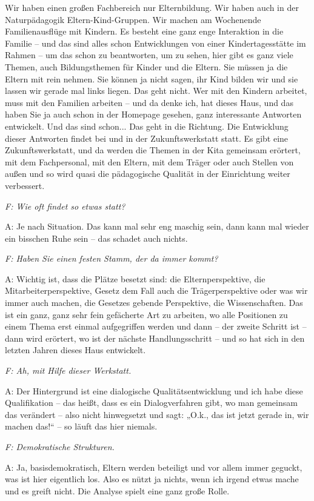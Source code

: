 \begin{linenumbers}
Wir haben einen großen Fachbereich nur Elternbildung. Wir haben auch in der Naturpädagogik Eltern-Kind-Gruppen. Wir machen am Wochenende Familienausflüge mit Kindern. Es besteht eine ganz enge Interaktion in die Familie -- und das sind alles schon Entwicklungen von einer Kindertagesstätte im Rahmen -- um das schon zu beantworten, um zu sehen, hier gibt es ganz viele Themen, auch Bildungsthemen für Kinder und die Eltern. Sie müssen ja die Eltern mit rein nehmen. Sie können ja nicht sagen, ihr Kind bilden wir und sie lassen wir gerade mal links liegen. Das geht nicht. Wer mit den Kindern arbeitet, muss mit den Familien arbeiten -- und da denke ich, hat dieses Haus, und das haben Sie ja auch schon in der Homepage gesehen, ganz interessante Antworten entwickelt. Und das sind schon... Das geht in die Richtung. Die Entwicklung dieser Antworten findet bei und in der Zukunftswerkstatt statt. Es gibt eine Zukunftswerkstatt, und da werden die Themen in der Kita gemeinsam erörtert, mit dem Fachpersonal, mit den Eltern, mit dem Träger oder auch Stellen von außen und so wird quasi die pädagogische Qualität in der Einrichtung weiter verbessert. 

\emph{F: Wie oft findet so etwas statt?}

A: Je nach Situation. Das kann mal sehr eng maschig sein, dann kann mal wieder ein bisschen Ruhe sein -- das schadet auch nichts. 

\emph{F: Haben Sie einen festen Stamm, der da immer kommt?}

A: Wichtig ist, dass die Plätze besetzt sind: die Elternperspektive, die Mitarbeiterperspektive, Gesetz dem Fall auch die Trägerperspektive oder was wir immer auch machen, die Gesetzes gebende Perspektive, die Wissenschaften. Das ist ein ganz, ganz sehr fein gefächerte Art zu arbeiten, wo alle Positionen zu einem Thema erst einmal aufgegriffen werden und dann -- der zweite Schritt ist -- dann wird erörtert, wo ist der nächste Handlungsschritt -- und so hat sich in den letzten Jahren dieses Haus entwickelt. 

\emph{F: Ah, mit Hilfe dieser Werkstatt.} 

A: Der Hintergrund ist eine dialogische Qualitätsentwicklung und ich habe diese Qualifikation -- das heißt, dass es ein Dialogverfahren gibt, wo man gemeinsam das verändert -- also nicht hinwegsetzt und sagt: „O.k., das ist jetzt gerade in, wir machen das!“ -- so läuft das hier niemals.

\emph{F: Demokratische Strukturen.}

A: Ja, basisdemokratisch, Eltern werden beteiligt und vor allem immer geguckt, was ist hier eigentlich los. Also es nützt ja nichts, wenn ich irgend etwas mache und es greift nicht. Die Analyse spielt eine ganz große Rolle.


\end{linenumbers}
